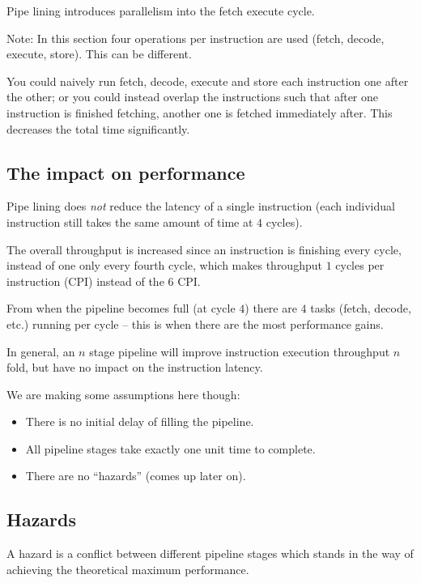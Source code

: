Pipe lining introduces parallelism into the fetch execute cycle.

\begin{note}
	Note: In this section four operations per instruction are used (fetch, decode, execute, store). This can be different.
\end{note}

You could naively run fetch, decode, execute and store each instruction one after the other; or you could instead overlap the instructions such that after one instruction is finished fetching, another one is fetched immediately after.
This decreases the total time significantly.

\subsection{The impact on performance}\label{sub:the_impact_on_performance}

Pipe lining does \emph{not} reduce the latency of a single instruction (each individual instruction still takes the same amount of time at \(4\) cycles).

The overall throughput is increased since an instruction is finishing every cycle, instead of one only every fourth cycle, which makes throughput \(1\) cycles per instruction (CPI) instead of the \(6\) CPI.

From when the pipeline becomes full (at cycle \(4\)) there are \(4\) tasks (fetch, decode, etc.) running per cycle -- this is when there are the most performance gains.

\medskip
\noindent
In general, an \(n\) stage pipeline will improve instruction execution throughput \(n\) fold, but have no impact on the instruction latency.

We are making some assumptions here though:
\begin{itemize}
	\item There is no initial delay of filling the pipeline.
	\item All pipeline stages take exactly one unit time to complete.
	\item There are no ``hazards'' (comes up later on).
\end{itemize}

\subsection{Hazards}\label{sub:hazards}

A hazard is a conflict between different pipeline stages which stands in the way of achieving the theoretical maximum performance.

